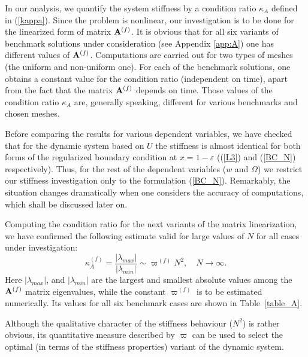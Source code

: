 In our analysis, we quantify the system stiffness by a condition
ratio $\kappa_A$ defined in (\ref{kappa}).
Since the problem is nonlinear, our
investigation is to be done for the linearized form of matrix ${\bf
A}^{(f)}$. It is obvious that for all six variants of benchmark
solutions under consideration (see Appendix \ref{app:A}) one has
different values of ${\bf A}^{(f)}$. Computations are carried out
for two types of meshes (the uniform and non-uniform one). For each
of the benchmark solutions, one obtains a constant  value for the condition ratio (independent on
time), apart from the fact that the matrix
 ${\bf A}^{(f)}$ depends on time. Those values of the condition ratio $\kappa_A$ are,
generally speaking, different for
various benchmarks and chosen meshes.

Before comparing the results for various dependent variables, we
have checked that for the dynamic system based on $U$ the stiffness
is almost identical for both forms of the regularized boundary
condition at $x=1-\varepsilon$ ((\ref{L3}) and (\ref{BC_N})
respectively). Thus, for the rest of the dependent variables ($w$ and
$\Omega$) we restrict our stiffness investigation only to the
formulation (\ref{BC_N}). Remarkably, the situation changes
dramatically when one considers the accuracy of  computations, which
shall be discussed later on.

Computing the condition ratio for the next variants of the matrix
linearization, we have confirmed the following estimate valid for large values of
$N$ for all cases under investigation:
\begin{equation}
\label{kappa}
\kappa_A^{(f)}=\frac{|\lambda_{max}|}{|\lambda_{min}|}\sim \varpi^{(f)} N^2,\quad N\to\infty.
\end{equation}
Here $|\lambda_{max}|$, and $|\lambda_{min}|$ are the largest and
smallest absolute values among the ${\bf A}^{(f)}$ matrix
eigenvalues, while the constant $\varpi^{(f)}$ is to be estimated
numerically. Its values for all six benchmark cases are shown in
 Table~\ref{table_A}.


Although the qualitative character
of the stiffness behaviour ($N^2$) is rather obvious, its
quantitative measure described by $\varpi$ can be used to select the
optimal (in terms of the stiffness properties) variant of the
dynamic system.


